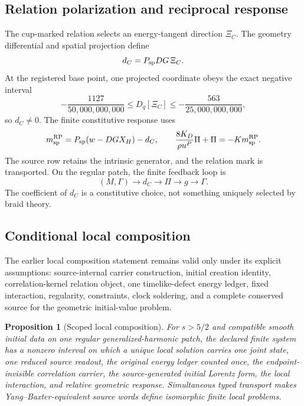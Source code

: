 \documentclass[12pt,a4paper,twoside]{article}
\newtheorem{proposition}{Proposition}
\begin{document}
\subsection{Relation polarization and reciprocal response}

The cup-marked relation selects an energy-tangent direction $\Xi_C$. The geometry differential and spatial projection define
\begin{equation}
d_C=P_{\rm sp}DG\,\Xi_C.
\end{equation}
At the registered base point, one projected coordinate obeys the exact negative interval
\begin{equation}
-\frac{1127}{50{,}000{,}000{,}000}
\leq D_q[\Xi_C]
\leq-\frac{563}{25{,}000{,}000{,}000},
\end{equation}
so $d_C\neq0$. The finite constitutive response uses
\begin{equation}
m_{\rm sp}^{\rm RP}=P_{\rm sp}(w-DGX_H)-d_C,
\qquad
\frac{8K_D}{\rho u^P}\Pi+\Pi=-Km_{\rm sp}^{\rm RP}.
\end{equation}
The source row retains the intrinsic generator, and the relation mark is transported. On the regular patch, the finite feedback loop is
\begin{equation}
(M,\Gamma)\longrightarrow d_C\longrightarrow\Pi\longrightarrow g\longrightarrow\Gamma.
\end{equation}
The coefficient of $d_C$ is a constitutive choice, not something uniquely selected by braid theory.

\subsection{Conditional local composition}

The earlier local composition statement remains valid only under its explicit assumptions: source-internal carrier construction, initial creation identity, correlation-kernel relation object, one timelike-defect energy ledger, fixed interaction, regularity, constraints, clock soldering, and a complete conserved source for the geometric initial-value problem.

\begin{proposition}[Scoped local composition]
For $s>5/2$ and compatible smooth initial data on one regular generalized-harmonic patch, the declared finite system has a nonzero interval on which a unique local solution carries one joint state, one reduced source readout, the original energy ledger counted once, the endpoint-invisible correlation carrier, the source-generated initial Lorentz form, the local interaction, and relative geometric response. Simultaneous typed transport makes Yang--Baxter-equivalent source words define isomorphic finite local problems.
\end{proposition}
\end{document}
